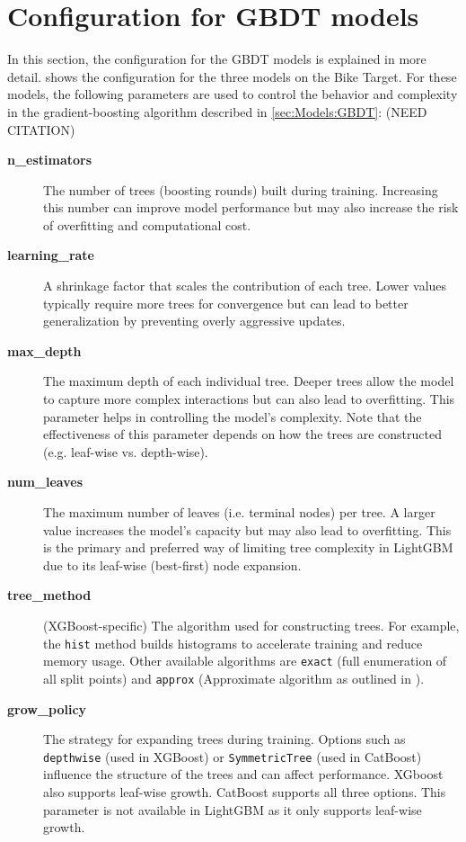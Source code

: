 \section{Configuration for GBDT models}

In this section, the configuration for the GBDT models is explained in more detail.  shows the configuration for the three models on the Bike Target. For these models, the following parameters are used to control the behavior and complexity in the gradient-boosting algorithm described in \cref{sec:Models:GBDT}: (NEED CITATION)

\begin{description}
  \item[\textbf{n\_estimators}] The number of trees (boosting rounds) built during training. Increasing this number can improve model performance but may also increase the risk of overfitting and computational cost.
  
  \item[\textbf{learning\_rate}] A shrinkage factor that scales the contribution of each tree. Lower values typically require more trees for convergence but can lead to better generalization by preventing overly aggressive updates.
  
  \item[\textbf{max\_depth}] The maximum depth of each individual tree. Deeper trees allow the model to capture more complex interactions but can also lead to overfitting. This parameter helps in controlling the model’s complexity. Note that the effectiveness of this parameter depends on how the trees are constructed (e.g. leaf-wise vs. depth-wise).

  \item[\textbf{num\_leaves}] The maximum number of leaves (i.e. terminal nodes) per tree. A larger value increases the model’s capacity but may also lead to overfitting. This is the primary and preferred way of limiting tree complexity in LightGBM due to its leaf-wise (best-first) node expansion.
  
  \item[\textbf{tree\_method}] (XGBoost-specific) The algorithm used for constructing trees. For example, the \texttt{hist} method builds histograms to accelerate training and reduce memory usage. Other available algorithms are \texttt{exact} (full enumeration of all split points) and \texttt{approx} (Approximate algorithm as outlined in \cite[Chapter~3.2]{chen_xgboost_2016}).
  
  \item[\textbf{grow\_policy}] The strategy for expanding trees during training. Options such as \texttt{depthwise} (used in XGBoost) or \texttt{SymmetricTree} (used in CatBoost) influence the structure of the trees and can affect performance. XGboost also supports leaf-wise growth. CatBoost supports all three options. This parameter is not available in LightGBM as it only supports leaf-wise growth.
  

\end{description}
